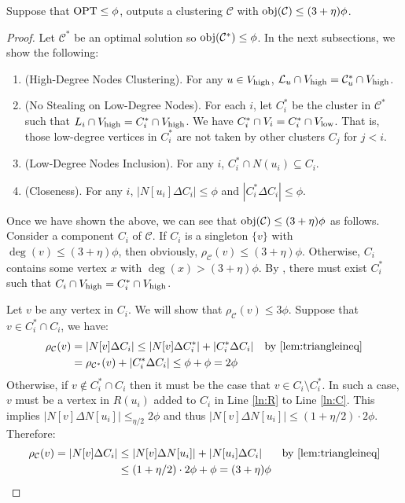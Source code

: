 \begin{theorem} Suppose that $\mathrm{OPT} \leq \phi$,  outputs a clustering $\mathcal{C}$ with $\mathrm{obj}(\mathcal{C})\leq (3+\eta) \phi$. 
\end{theorem}
\begin{proof} Let $\mathcal{C}^{*}$ be an optimal solution so $\mathrm{obj}(\mathcal{C}^{*}) \leq \phi$. In the next subsections, we show the following:
\begin{enumerate}
\item \label{itm:first} (High-Degree Nodes Clustering). For any $u \in V_{\operatorname{high}}$, $\mathcal{L}_u \cap  V_{\operatorname{high}} = \mathcal{C}^{*}_{u} \cap V_{\operatorname{high}}$. 
\item (No Stealing on Low-Degree Nodes). For each $i$, let $C^{*}_i$ be the cluster in $\mathcal{C}^{*}$ such that $L_i \cap V_{\operatorname{high}} = {C}^{*}_{i} \cap  V_{\operatorname{high}}$. We have $C^{*}_i \cap V_i = C^{*}_i \cap V_{\operatorname{low}}$. That is, those low-degree vertices in $C^{*}_i$ are not taken by other clusters $C_j$ for $j<i$.
\item (Low-Degree Nodes Inclusion). For any $i$, $C^{*}_i \cap N(u_i) \subseteq C_i$. 
\item (Closeness). \label{itm:last} For any $i$, $|N[u_i] \Delta C_i| \leq \phi$ and $|C^{*}_i \Delta C_{i}| \leq \phi$.
\end{enumerate}
Once we have shown the above, we can see that $\mathrm{obj}(\mathcal{C}) \leq (3+\eta) \phi$ as follows. Consider a component $C_i$ of $\mathcal{C}$. If $C_i$ is a singleton $\{v\}$ with $\deg(v) \leq (3+\eta)\phi$, then obviously, $\rho_{\mathcal{C}}(v) \leq (3+\eta)\phi$. Otherwise, $C_i$ contains some vertex $x$ with $\deg(x) >  (3+\eta)\phi$. By , there must exist $C^{*}_i$ such that $C_i \cap V_{\operatorname{high}} = {C}^{*}_{i} \cap V_{\operatorname{high}}$.

Let $v$ be any vertex in $C_i$. We will show that $\rho_{\mathcal{C}}(v) \leq 3\phi$. Suppose that $v \in C^{*}_i \cap C_i$, we have: 
\begin{align*}
\rho_{\mathcal{C}}(v) &= |N[v] \Delta C_i|
\leq |N[v] \Delta C^{*}_i | + |C^{*}_i \Delta C_i|  && \mbox{by \Cref{lem:triangleineq}}\\
&= \rho_{\mathcal{C^{*}}}(v) + |C^{*}_i \Delta C_i| \leq \phi + \phi  = 2\phi 
\end{align*}
Otherwise, if $v \notin C^{*}_i \cap C_i$ then it must be the case that $v \in C_i \setminus C^{*}_i$. In such a case, $v$ must be a vertex in $R(u_i)$ added to $C_i$ in Line \ref{ln:R} to Line \ref{ln:C}. This implies $|N[v] \Delta N[u_i]| \leq_{\eta/2} 2\phi$ and thus $|N[v] \Delta N[u_i]| \leq (1+\eta/2)\cdot2\phi$. Therefore:
\begin{align*}
\rho_{\mathcal{C}}(v) = |N[v] \Delta C_i| 
&\leq |N[v] \Delta N[u_i]| + |N[u_i] \Delta C_i| && \mbox{by \Cref{lem:triangleineq}} \\
&\leq (1+\eta/2)\cdot 2\phi + \phi = (3+\eta)\phi
\end{align*}
\end{proof}

